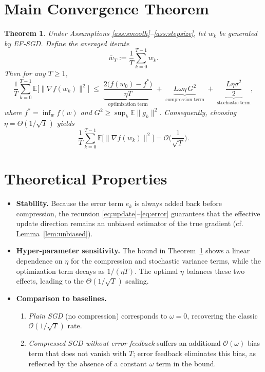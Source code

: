\documentclass{article}
\newtheorem{theorem}{Theorem}
\newcommand{\E}{\mathbb{E}}
\begin{document}
\section*{Main Convergence Theorem}
\begin{theorem}\label{thm:main}
Under Assumptions \ref{ass:smooth}–\ref{ass:stepsize}, let $w_{k}$ be generated by EF‑SGD.  Define the averaged iterate
\[
\bar w_{T}:=\frac1T\sum_{k=0}^{T-1}w_{k}.
\]
Then for any $T\ge1$,
\[
\frac1T\sum_{k=0}^{T-1}\E\big[\|\nabla f(w_{k})\|^{2}\big]
\;\le\;
\underbrace{\frac{2\big(f(w_{0})-f^{*}\big)}{\eta T}}_{\text{optimization term}}
\;+\;
\underbrace{L\omega\eta\,G^{2}}_{\text{compression term}}
\;+\;
\underbrace{\frac{L\eta\sigma^{2}}{2}}_{\text{stochastic term}},
\]
where $f^{*}=\inf_{w}f(w)$ and $G^{2}\ge\sup_{k}\E\|g_{k}\|^{2}$.
Consequently, choosing $\eta=\Theta(1/\sqrt{T})$ yields
\[
\frac1T\sum_{k=0}^{T-1}\E\big[\|\nabla f(w_{k})\|^{2}\big]=\mathcal O\!\Big(\frac{1}{\sqrt{T}}\Big).
\]
\end{theorem}

\section*{Theoretical Properties}
\begin{itemize}
    \item \textbf{Stability.}  Because the error term $e_{k}$ is always added back before compression, the recursion \eqref{eq:update}–\eqref{eq:error} guarantees that the effective update direction remains an unbiased estimator of the true gradient (cf. Lemma~\ref{lem:unbiased}).
    \item \textbf{Hyper‑parameter sensitivity.}  The bound in Theorem~\ref{thm:main} shows a linear dependence on $\eta$ for the compression and stochastic variance terms, while the optimization term decays as $1/(\eta T)$.  The optimal $\eta$ balances these two effects, leading to the $\Theta(1/\sqrt{T})$ scaling.
    \item \textbf{Comparison to baselines.}
    \begin{enumerate}[label=(\alph*)]
        \item \emph{Plain SGD} (no compression) corresponds to $\omega=0$, recovering the classic $\mathcal O(1/\sqrt{T})$ rate.
        \item \emph{Compressed SGD without error feedback} suffers an additional $\mathcal O(\omega)$ bias term that does not vanish with $T$; error feedback eliminates this bias, as reflected by the absence of a constant $\omega$ term in the bound.
    \end{enumerate}
\end{itemize}
\end{document}
